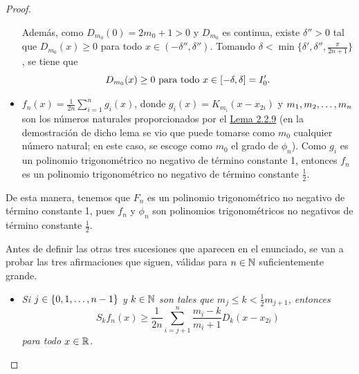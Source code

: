 \documentclass[a4paper, 12pt]{book}
\begin{document}
\begin{proof}
\begin{itemize}
        Además, como $D_{m_0}(0) = 2m_0+1 > 0$ y $D_{m_0}$ es continua, existe $\delta'' > 0$ tal que $D_{m_0}(x) \geq 0$ para todo $x \in (-\delta'',\delta'')$. Tomando $\delta < \min\{\delta',\delta'',\frac{\pi}{2n+1}\}$, se tiene que
        \begin{equation}\label{2.2.14}
            D_{m_0}(x) \geq 0 \textup{ para todo } x \in [-\delta,\delta] = I_0'.
        \end{equation}
        \item $f_n(x) = \frac{1}{2n}\sum_{i=1}^n g_i(x)$, donde $g_i(x)= K_{m_i}(x-x_{2i})$ y $m_1,m_2,\mathellipsis,m_n$ son los números naturales proporcionados por el \hyperref[2.2.9]{Lema 2.2.9} (en la demostración de dicho lema se vio que puede tomarse como $m_0$ cualquier número natural; en este caso, se escoge como $m_0$ el grado de $\phi_n$). Como $g_i$ es un polinomio trigonométrico no negativo de término constante 1, entonces $f_n$ es un polinomio trigonométrico no negativo de término constante $\frac{1}{2}$.
    \end{itemize}

    De esta manera, tenemos que $F_n$ es un polinomio trigonométrico no negativo de término constante 1, pues $f_n$ y $\phi_n$ son polinomios trigonométricos no negativos de término constante $\frac{1}{2}$.

    Antes de definir las otras tres sucesiones que aparecen en el enunciado, se van a probar las tres afirmaciones que siguen, válidas para $n \in \mathbb N$ suficientemente grande.

    \begin{itemize}
        \item \textit{Si $j \in \{0,1,\mathellipsis,n-1\}$ y $k \in \mathbb N$ son tales que $m_j \leq k < \frac{1}{2}m_{j+1}$, entonces
        \begin{equation}\label{2.2.15}
            S_kf_n(x) \geq \frac{1}{2n}\sum_{i=j+1}^n \frac{m_i-k}{m_i+1}D_k(x-x_{2i})
        \end{equation}
        para todo $x \in \mathbb R$.}


\end{itemize}
\end{proof}
\end{document}
